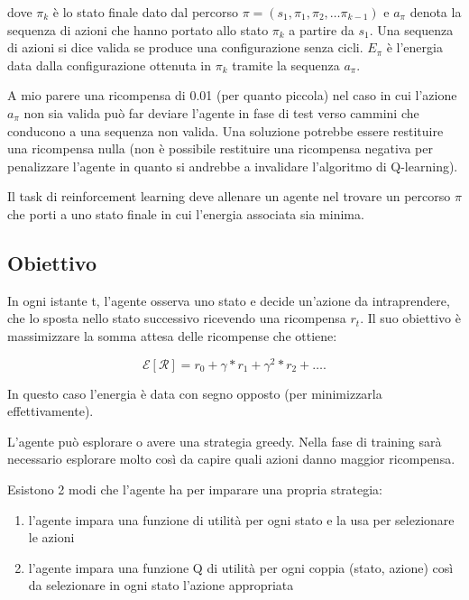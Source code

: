 \documentclass[conference]{IEEEtran}
\begin{document}
dove $\pi_k$ è lo stato finale dato dal percorso $\pi = (s_1, \pi_1, \pi_2, \dots \pi_{k-1})$ e $a_{\pi}$ denota la sequenza di azioni che hanno portato allo stato $\pi_k$ a partire da $s_1$. Una sequenza di azioni si dice valida se produce una configurazione senza cicli. $E_{\pi}$ è l'energia data dalla configurazione ottenuta in $\pi_k$ tramite la sequenza $a_{\pi}$.

A mio parere una ricompensa di 0.01 (per quanto piccola) nel caso in cui l'azione $a_{\pi}$ non sia valida può far deviare l'agente in fase di test verso cammini che conducono a una sequenza non valida. Una soluzione potrebbe essere restituire una ricompensa nulla (non è possibile restituire una ricompensa negativa per penalizzare l'agente in quanto si andrebbe a invalidare l'algoritmo di Q-learning).

Il task di reinforcement learning deve allenare un agente nel trovare un percorso $\pi$ che porti a uno stato finale in cui l'energia associata sia minima.

\subsection{Obiettivo}

In ogni istante t, l'agente osserva uno stato e decide un'azione da intraprendere, che lo sposta nello stato successivo ricevendo una ricompensa $r_t$. Il suo obiettivo è massimizzare la somma attesa delle ricompense che ottiene:

\begin{equation}
\mathcal{E}[\mathcal{R}] = r_0 + \gamma*r_1 + \gamma^2*r_2 + \dots.
\end{equation}

In questo caso l'energia è data con segno opposto (per minimizzarla effettivamente).

L'agente può esplorare o avere una strategia greedy. Nella fase di training sarà necessario esplorare molto così da capire quali azioni danno maggior ricompensa.

Esistono 2 modi che l'agente ha per imparare una propria strategia:

\begin{enumerate}
 \item l'agente impara una funzione di utilità per ogni stato e la usa per selezionare le azioni
 \item l'agente impara una funzione Q di utilità per ogni coppia (stato, azione) così da selezionare in ogni stato l'azione appropriata
\end{enumerate}
\end{document}

